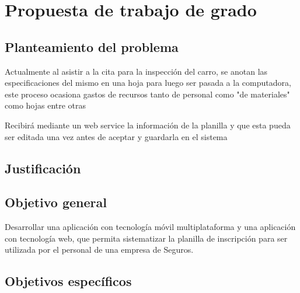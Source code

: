 \chapter{Propuesta de trabajo de grado}

\section{Planteamiento del problema}
\setlength{\parskip}{5mm}

Actualmente al asistir a la cita para la inspección del carro, se anotan las especificaciones del mismo en una hoja para luego ser pasada a la computadora, este proceso ocasiona gastos de recursos tanto de personal como "de materiales" como hojas entre otras  

Recibirá mediante un web service la información de la planilla y que esta pueda ser editada una vez antes de aceptar y guardarla en el sistema

\setlength{\parskip}{0mm}


\section{Justificación}


\section{Objetivo general}

Desarrollar una aplicación con tecnología móvil multiplataforma y una aplicación con tecnología web, que permita sistematizar la planilla de inscripción para ser utilizada por el personal de una empresa de Seguros. 

\section{Objetivos específicos}

